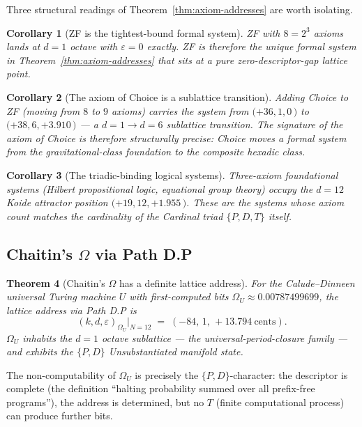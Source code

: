 \documentclass[11pt,a4paper]{article}
\newtheorem{theorem}{Theorem}[section]
\newtheorem{corollary}[theorem]{Corollary}
\theoremstyle{definition}
\theoremstyle{remark}
\begin{document}
Three structural readings of Theorem~\ref{thm:axiom-addresses} are worth isolating.

\begin{corollary}[ZF is the tightest-bound formal system]\label{cor:zf-tight}
ZF with $8=2^{3}$ axioms lands at $d=1$ octave with $\varepsilon = 0$ exactly. ZF is therefore the unique formal system in Theorem~\ref{thm:axiom-addresses} that sits at a pure zero-descriptor-gap lattice point.
\end{corollary}

\begin{corollary}[The axiom of Choice is a sublattice transition]\label{cor:ac-transition}
Adding Choice to ZF (moving from $8$ to $9$ axioms) carries the system from $(+36, 1, 0$\,\textcent$)$ to $(+38, 6, +3.910$\,\textcent$)$ --- a $d=1 \to d=6$ sublattice transition. The signature of the axiom of Choice is therefore structurally precise: Choice moves a formal system from the gravitational-class foundation to the composite hexadic class.
\end{corollary}

\begin{corollary}[The triadic-binding logical systems]\label{cor:triadic-logics}
Three-axiom foundational systems (Hilbert propositional logic, equational group theory) occupy the $d=12$ Koide attractor position $(+19, 12, +1.955$\,\textcent$)$. These are the systems whose axiom count matches the cardinality of the Cardinal triad $\{P,D,T\}$ itself.
\end{corollary}

\subsection{Chaitin's $\Omega$ via Path D.P}

\begin{theorem}[Chaitin's $\Omega$ has a definite lattice address]\label{thm:chaitin}
For the Calude--Dinneen universal Turing machine $U$ with first-computed bits $\Omega_{U} \approx 0.00787499699$, the lattice address via Path D.P is
\[
(k, d, \varepsilon)_{\Omega_{U}}\Big|_{N=12} \;=\; (-84,\, 1,\, +13.794\ \text{cents}).
\]
$\Omega_{U}$ inhabits the $d=1$ octave sublattice --- the universal-period-closure family --- and exhibits the $\{P,D\}$ Unsubstantiated manifold state.
\end{theorem}

The non-computability of $\Omega_{U}$ is precisely the $\{P,D\}$-character: the descriptor is complete (the definition ``halting probability summed over all prefix-free programs''), the address is determined, but no $T$ (finite computational process) can produce further bits.
\end{document}
